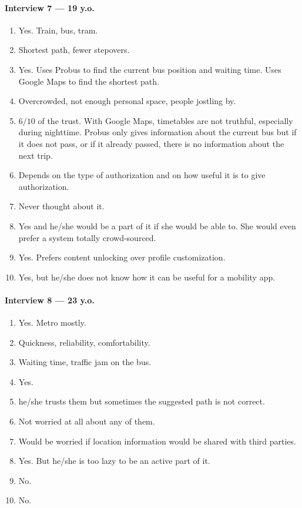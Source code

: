 \documentclass[a4paper, 11pt, twocolumn]{article}
\begin{document}
\paragraph*{Interview 7 --- 19 y.o.}
\begin{enumerate}
    \item Yes. Train, bus, tram.
    \item Shortest path, fewer stepovers.
    \item Yes. Uses Probus to find the current bus position and waiting time. Uses Google Maps to find the shortest path.
    \item Overcrowded, not enough personal space, people jostling by.
    \item $6/10$ of the trust. With Google Maps, timetables are not truthful, especially during nighttime. Probus only gives information about the current bus but if it does not pass, or if it already passed, there is no information about the next trip.
    \item  Depends on the type of authorization and on how useful it is to give authorization.
    \item Never thought about it.
    \item Yes and he/she would be a part of it if she would be able to. She would even prefer a system totally crowd-sourced.
    \item Yes. Prefers content unlocking over profile customization.
    \item Yes, but he/she does not know how it can be useful for a mobility app.
\end{enumerate}

\paragraph*{Interview 8 --- 23 y.o.}
\begin{enumerate}
    \item Yes. Metro mostly.
    \item Quickness, reliability, comfortability.
    \item Waiting time, traffic jam on the bus.
    \item Yes.
    \item he/she trusts them but sometimes the suggested path is not correct.
    \item Not worried at all about any of them.
    \item Would be worried if location information would be shared with third parties.
    \item Yes. But he/she is too lazy to be an active part of it.
    \item No.
    \item No.
\end{enumerate}
\end{document}
